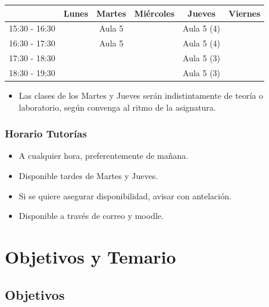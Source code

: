 \documentclass[a4paper,t,xcolor=pst,dvips,colortheme]{beamer}
\begin{document}
\begin{frame}[c]
\begin{small}
{\begin{center}
    	\begin{tabular}{||l|c|c|c|c|c||}
    	\hline \hline
    				   & Lunes & Martes  & Miércoles & Jueves     & Viernes \\ \hline \hline
        15:30 - 16:30  &       & Aula 5  &           & Aula 5 (4) &         \\ \hline
        16:30 - 17:30  &       & Aula 5  &           & Aula 5 (4) &         \\ \hline
    	17:30 - 18:30  &       &         &           & Aula 5 (3) &         \\ \hline
        18:30 - 19:30  &       &         &           & Aula 5 (3) &         \\ \hline
        \hline
    	\end{tabular}
    	\end{center}
    }

	\end{small}
	\begin{itemize}
        \item<3-> Las clases de los Martes y Jueves serán indistintamente de teoría o laboratorio, según convenga al ritmo de la asignatura.
	\end{itemize}
\end{frame}

\begin{frame}[c]
	\frametitle{Horario Tutorías}
    \begin{itemize}[<+->]
        \item A cualquier hora, preferentemente de mañana.
        \item Disponible tardes de Martes y Jueves.
        \item Si se quiere asegurar disponibilidad, avisar con antelación.
        \item Disponible a través de correo y \alert{moodle}.
	\end{itemize}
\end{frame}

\section{Objetivos y Temario}

\subsection{Objetivos}
\end{document}
